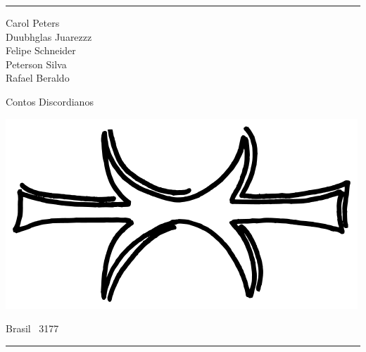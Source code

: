 \thispagestyle{empty}

\hrule

\begin{center}
{\scriptsize
Carol Peters\\
Duubhglas Juarezzz\\
Felipe Schneider\\
Peterson Silva\\
Rafael Beraldo\\
}
\vspace{.5cm}

{\Large Contos Discordianos}

\vspace{2cm}

\includegraphics[scale=.35]{img/eris_hand}

\vfill

Brasil \textperiodcentered\ 3177
\vspace{.5em}
\hrule

\end{center}
\newpage

